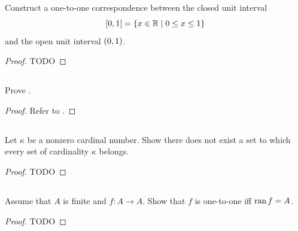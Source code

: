 \documentclass{report}
\begin{document}
\subsection{}%

  Construct a one-to-one correspondence between the closed unit interval
    $$\left[0, 1\right] = \{x \in \mathbb{R} \mid 0 \leq x \leq 1\}$$
    and the open unit interval $\left(0, 1\right)$.

  \begin{proof}
    TODO
  \end{proof}

\subsection{}%

  Prove .

  \begin{proof}
    Refer to .
  \end{proof}

\subsection{}%

  Let $\kappa$ be a nonzero cardinal number.
  Show there does not exist a set to which every set of cardinality $\kappa$
    belongs.

  \begin{proof}
    TODO
  \end{proof}

\subsection{}%

  Assume that $A$ is finite and $f \colon A \rightarrow A$.
  Show that $f$ is one-to-one iff $\mathop{\text{ran}}{f} = A$.

  \begin{proof}
    TODO
  \end{proof}

\subsection{}%
\end{document}
